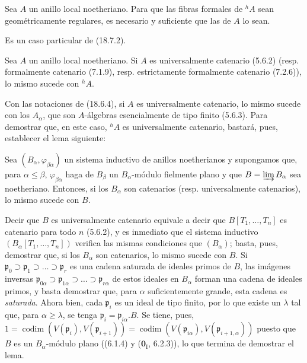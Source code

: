 \begin{corollary}[18.7.4]
\label{IV.18.7.4}
Sea $A$ un anillo local noetheriano. Para que las fibras formales de ${}^h\!A$ sean geométricamente regulares, es necesario y suficiente que las de $A$ lo sean.
\end{corollary}

Es un caso particular de (18.7.2).

\begin{proposition}[18.7.5]
\label{IV.18.7.5}
Sea $A$ un anillo local noetheriano. Si $A$ es universalmente catenario \textup{(5.6.2) (resp.} formalmente catenario \textup{(7.1.9), resp.} estrictamente formalmente catenario \textup{(7.2.6))}, lo mismo sucede con ${}^h\!A$.
\end{proposition}

Con las notaciones de (18.6.4), si $A$ es universalmente catenario, lo mismo sucede con los $A_\alpha$, que son $A$-álgebras esencialmente de tipo finito (5.6.3). Para demostrar que, en este caso, ${}^h\!A$ es universalmente catenario, bastará, pues, establecer el lema siguiente:

\begin{lemma}[18.7.5.1]
\label{IV.18.7.5.1}
Sea $(B_\alpha,\varphi_{\beta\alpha})$ un sistema inductivo de anillos noetherianos y supongamos que, para $\alpha\leq\beta$, $\varphi_{\beta\alpha}$ haga de $B_\beta$ un $B_\alpha$-módulo fielmente plano y que $B=\varinjlim B_\alpha$ sea noetheriano. Entonces, si los $B_\alpha$ son catenarios \textup{(resp.} universalmente catenarios\textup{)}, lo mismo sucede con $B$.
\end{lemma}

Decir que $B$ es universalmente catenario equivale a decir que $B[T_1,\ldots,T_n]$ es catenario para todo $n$ (5.6.2), y es inmediato que el sistema inductivo $(B_\alpha[T_1,\ldots,T_n])$ verifica las mismas condiciones que $(B_\alpha)$; basta, pues, demostrar que, si los $B_\alpha$ son catenarios, lo mismo sucede con $B$. Si $\mathfrak p_0\supset\mathfrak p_1\supset\ldots\supset\mathfrak p_r$ es una cadena saturada de ideales primos de $B$, las imágenes inversas $\mathfrak p_{0\alpha}\supset\mathfrak p_{1\alpha}\supset\ldots\supset\mathfrak p_{r\alpha}$ de estos ideales en $B_\alpha$ forman una cadena de ideales primos, y basta demostrar que, para $\alpha$ suficientemente grande, esta cadena es \emph{saturada}. Ahora bien, cada $\mathfrak p_i$ es un ideal de tipo finito, por lo que existe un $\lambda$ tal que, para $\alpha\geq\lambda$, se tenga $\mathfrak p_i=\mathfrak p_{i\alpha}.B$. Se tiene, pues,
$1=\operatorname{codim}(V(\mathfrak p_i),V(\mathfrak p_{i+1}))=\operatorname{codim}(V(\mathfrak p_{i\alpha}),V(\mathfrak p_{i+1,\alpha}))$
puesto que $B$ es un $B_\alpha$-módulo plano ((6.1.4) y ($\mathbf{0}_{\mathrm I}$, 6.2.3)), lo que termina de demostrar el lema.

